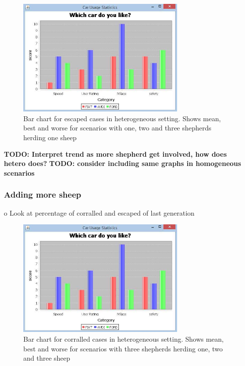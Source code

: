 \documentclass[conference]{IEEEtran}
\begin{document}
\begin{figure}[ht]
	\centering
	\includegraphics[width=3.3in]{imgs/barchart.jpg}
	\caption{Bar chart for escaped cases in heterogeneous setting. Shows mean, best and worse for scenarios with one, two and three shepherds herding one sheep}
	\label{fig:escaped_oneSheep}
\end{figure}

\textbf{TODO: Interpret trend as more shepherd get involved, how does hetero does?}
\textbf{TODO: consider including same graphs in homogeneous scenarios}

\vspace{0.5em}
\subsubsection{Adding more sheep}
o	Look at percentage of corralled and escaped of last generation


\begin{figure}[ht]
	\centering
	\includegraphics[width=3.3in]{imgs/barchart.jpg}
	\caption{Bar chart for corralled cases in heterogeneous setting. Shows mean, best and worse for scenarios with three shepherds herding one, two and three sheep}
	\label{fig:corralled_threeShepherd}
\end{figure}
\end{document}
